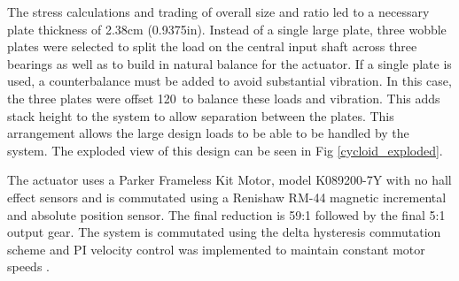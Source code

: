 The stress calculations and trading of overall size and ratio led to a necessary plate thickness of 2.38cm (0.9375in).
Instead of a single large plate, three wobble plates were selected to split the load on the central input shaft across three bearings as well as to build in natural balance for the actuator.
If a single plate is used, a counterbalance must be added to avoid substantial vibration.
In this case, the three plates were offset 120\textdegree\ to balance these loads and vibration.
This adds stack height to the system to allow separation between the plates.
This arrangement allows the large design loads to be able to be handled by the system.
The exploded view of this design can be seen in Fig \ref{cycloid_exploded}.

The actuator uses a Parker Frameless Kit Motor, model K089200-7Y with no hall effect sensors and is commutated using a Renishaw RM-44 magnetic incremental and absolute position sensor.
The final reduction is 59:1 followed by the final 5:1 output gear.
The system is commutated using the delta hysteresis commutation scheme and PI velocity control was implemented to maintain constant motor speeds \cite{electric_machines}.


